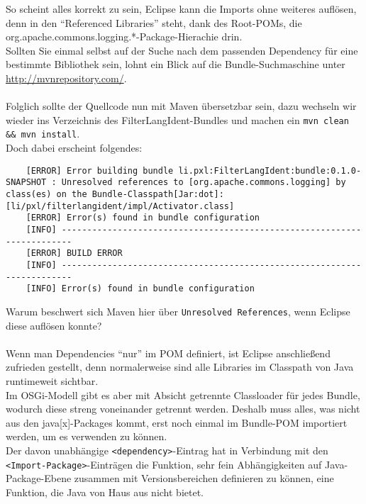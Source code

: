 \documentclass[a4paper,12pt]{scrartcl}
\begin{document}
So scheint alles korrekt zu sein, Eclipse kann die Imports ohne weiteres auflösen, denn in den "`Referenced Libraries"' steht, dank des Root-POMs, die org.apache.commons.logging.*-Package-Hierachie drin.\\
Sollten Sie einmal selbst auf der Suche nach dem passenden Dependency für eine bestimmte Bibliothek sein, lohnt ein Blick auf die Bundle-Suchmaschine unter \href{http://mvnrepository.com/}{http://mvnrepository.com/}.\\
\\
Folglich sollte der Quellcode nun mit Maven übersetzbar sein, dazu wechseln wir wieder ins Verzeichnis des FilterLangIdent-Bundles und machen ein \lstinline[breaklines=false, basicstyle=\itshape]|mvn clean && mvn install|.\\
Doch dabei erscheint folgendes:
\begin{lstlisting}
	[ERROR] Error building bundle li.pxl:FilterLangIdent:bundle:0.1.0-SNAPSHOT : Unresolved references to [org.apache.commons.logging] by class(es) on the Bundle-Classpath[Jar:dot]: [li/pxl/filterlangident/impl/Activator.class]
	[ERROR] Error(s) found in bundle configuration
	[INFO] ------------------------------------------------------------------------
	[ERROR] BUILD ERROR
	[INFO] ------------------------------------------------------------------------
	[INFO] Error(s) found in bundle configuration
\end{lstlisting}
Warum beschwert sich Maven hier über \lstinline[breaklines=false, basicstyle=\itshape]|Unresolved References|, wenn Eclipse diese auflösen konnte?\\
\\
Wenn man Dependencies "`nur"' im POM definiert, ist Eclipse anschließend zufrieden gestellt, denn normalerweise sind alle Libraries im Classpath von Java runtimeweit sichtbar.\\
Im OSGi-Modell gibt es aber mit Absicht getrennte Classloader für jedes Bundle, wodurch diese streng voneinander getrennt werden. Deshalb muss alles, was nicht aus den java[x]-Packages kommt, erst noch einmal im Bundle-POM importiert werden, um es verwenden zu können.\\
Der davon unabhängige \lstinline[breaklines=false, basicstyle=\itshape]|<dependency>|-Eintrag hat in Verbindung mit den \lstinline[breaklines=false, basicstyle=\itshape]|<Import-Package>|-Einträgen die Funktion, sehr fein Abhängigkeiten auf Java-Package-Ebene zusammen mit Versionsbereichen definieren zu können, eine Funktion, die Java von Haus aus nicht bietet.\\
\end{document}
